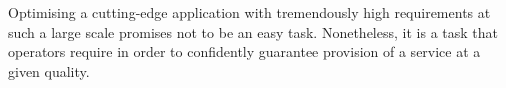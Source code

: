 \vspace{0.5cm}

Optimising a cutting-edge application with tremendously high requirements at such a large scale promises not to be an easy task. Nonetheless, it is a task that operators require in order to confidently guarantee provision of a service at a given quality.




